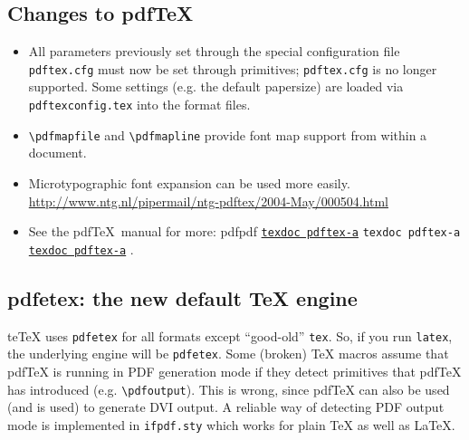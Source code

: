 \documentclass[11pt,a4paper]{article}
\newcommand{\pdfext}{pdf}
\newcommand{\dlink}[3]{%
  \ifpdf
    \ifx\pdfext#3
      \href{#1/#2.#3}{\texttt{texdoc #2}}%
    \else
      \texttt{texdoc #2}%
    \fi
  \else
     \href{#1/#2.#3}{\mbox{\texttt{texdoc #2}}}%
  \fi}
\begin{document}
\subsection{Changes to pdf\TeX{}}
\begin{itemize}
\item All parameters previously set through the special configuration
  file \verb+pdftex.cfg+ must now be set through primitives;
  \verb+pdftex.cfg+ is no longer supported. Some settings (e.g. the
  default papersize) are loaded via \verb+pdftexconfig.tex+ into the
  format files.
\item \verb+\pdfmapfile+ and \verb+\pdfmapline+ provide font map
  support from within a document.
\item Microtypographic font expansion can be used more easily.\\
  \url{http://www.ntg.nl/pipermail/ntg-pdftex/2004-May/000504.html}
\item See the pdf\TeX\ manual for more:
  \dlink{../../../texmf-dist/doc/pdftex/manual}{pdftex-a}{\pdfext}.
\end{itemize}

\subsection{pdfetex: the new default \TeX{} engine}
te\TeX{} uses \verb+pdfetex+ for all formats except ``good-old''
\verb+tex+. So, if you run \verb+latex+, the underlying engine will be
\verb+pdfetex+. Some (broken) \TeX{} macros assume that pdf\TeX{} is
running in PDF generation mode if they detect primitives that
pdf\TeX{} has introduced (e.g. \verb+\pdfoutput+). This is wrong,
since pdf\TeX{} can also be used (and is used) to generate DVI output.
A reliable way of detecting PDF output mode is implemented in
\verb+ifpdf.sty+ which works for plain \TeX{} as well as \LaTeX.
\end{document}
